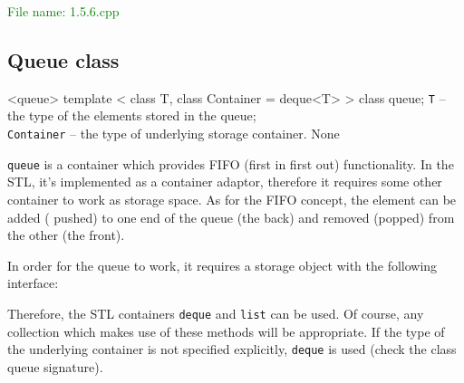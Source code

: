 \textcolor{green}{File name: 1.5.6.cpp}


\subsection{Queue class} %
\begin{methodinfo}
  {<queue>}
  {template  < class T, class Container = deque<T> > class queue;}
  {\texttt{T} – the type of the elements stored in the queue;\\
  \texttt{Container} – the type of underlying storage container.}
  {None}
  {\texttt{queue} is a container which provides FIFO (first in first out) functionality. 
  In the STL, it’s implemented as a container adaptor, therefore it requires some other 
  container to work as storage space. As for the FIFO concept, the element can be added (
  pushed) to one end of the queue (the back) and removed (popped) from the other (the front).

  In order for the queue to work, it requires a storage object with the following interface:

  
  
  
  
  Therefore, the STL containers \texttt{deque} and \texttt{list} can be used. Of course, any collection 
  which makes use of these methods will be appropriate. If the type of the underlying container is not 
  specified explicitly, \texttt{deque} is used (check the class queue signature).}
\end{methodinfo}

